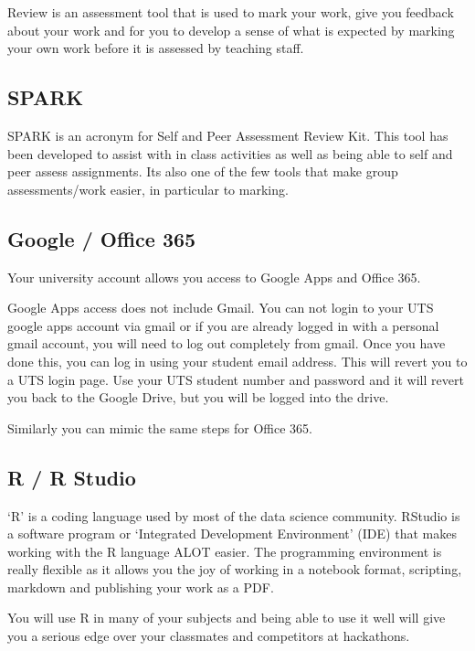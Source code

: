 \documentclass[]{book}
\theoremstyle{definition}
\theoremstyle{definition}
\theoremstyle{remark}
\begin{document}
Review is an assessment tool that is used to mark your work, give you
feedback about your work and for you to develop a sense of what is
expected by marking your own work before it is assessed by teaching
staff.

\subsection{SPARK}\label{spark}

SPARK is an acronym for Self and Peer Assessment Review Kit. This tool
has been developed to assist with in class activities as well as being
able to self and peer assess assignments. Its also one of the few tools
that make group assessments/work easier, in particular to marking.

\subsection{Google / Office 365}\label{google-office-365}

Your university account allows you access to Google Apps and Office 365.

Google Apps access does not include Gmail. You can not login to your UTS
google apps account via gmail or if you are already logged in with a
personal gmail account, you will need to log out completely from gmail.
Once you have done this, you can log in using your student email
address. This will revert you to a UTS login page. Use your UTS student
number and password and it will revert you back to the Google Drive, but
you will be logged into the drive.

Similarly you can mimic the same steps for Office 365.

\subsection{R / R Studio}\label{r-r-studio}

`R' is a coding language used by most of the data science community.
RStudio is a software program or `Integrated Development Environment'
(IDE) that makes working with the R language ALOT easier. The
programming environment is really flexible as it allows you the joy of
working in a notebook format, scripting, markdown and publishing your
work as a PDF.

You will use R in many of your subjects and being able to use it well
will give you a serious edge over your classmates and competitors at
hackathons.
\end{document}
